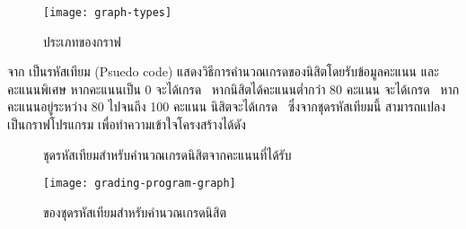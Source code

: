 \begin{figure}[ht!]
    \centering
    \texttt{[image: graph-types]}
    \caption{ประเภทของกราฟ}
    \label{fig:graphtype}
\end{figure}

จาก เป็นรหัสเทียม (Psuedo code) แสดงวิธีการคำนวณเกรดของนิสิตโดยรับข้อมูลคะแนน  
และคะแนนพิเศษ  หากคะแนนเป็น 0 จะได้เกรด \ หากนิสิตได้คะแนนต่ำกว่า 80 คะแนน 
จะได้เกรด \ หากคะแนนอยู่ระหว่าง 80 ไปจนถึง 100 คะแนน นิสิตจะได้เกรด \ ซึ่งจากชุดรหัสเทียมนี้ 
สามารถแปลงเป็นกราฟโปรแกรม เพื่อทำความเข้าใจโครงสร้างได้ดัง{ 

\begin{figure}[ht!]
    \begin{algorithm}[H]
        \begin{algorithmic}[1]

                \ENDIF
            \ENDIF


            \ENDIF

        \end{algorithmic}
    \end{algorithm}
    \caption{ชุดรหัสเทียมสำหรับคำนวณเกรดนิสิตจากคะแนนที่ได้รับ}
    \label{fig:pseudocodeGrading}
\end{figure}


\begin{figure}[ht!]
    \centering
    \texttt{[image: grading-program-graph]}
    \caption{{\cfg}ของชุดรหัสเทียมสำหรับคำนวณเกรดนิสิต}
    \label{fig:programGraph}
\end{figure}

}
